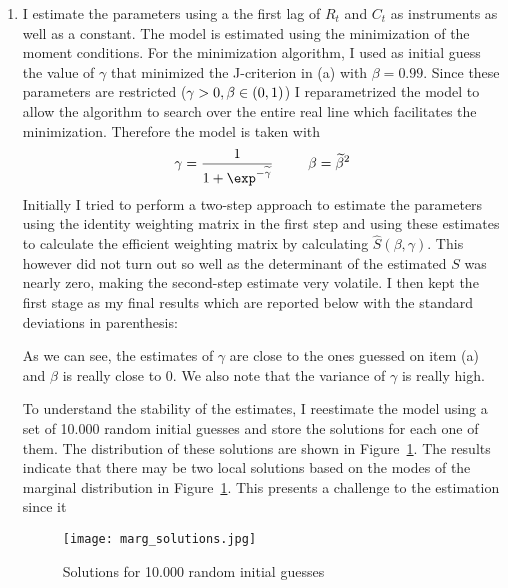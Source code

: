 \begin{solution}
\begin{enumerate}[label = \Alph*)]
    \item I estimate the parameters using a the first lag of \(R_t\) and \(C_t\) as instruments as well as a constant. The model is estimated using the minimization of the moment conditions. For the minimization algorithm, I used as initial guess the value of \(\gamma\) that minimized the J-criterion in (a) with \(\beta = 0.99\). Since these parameters are restricted (\(\gamma > 0, \beta \in \left( 0,1 \right)\)) I reparametrized the model to allow the algorithm to search over the entire real line which facilitates the minimization. Therefore the model is taken with
    \[
        \gamma = \frac{1}{1+\exp^{-\wt\gamma}} \hspace{25pt} \beta = \wt\beta^2
    \]
    Initially I tried to perform a two-step approach to estimate the parameters using the identity weighting matrix in the first step and using these estimates to calculate the efficient weighting matrix by calculating \(\widehat S(\beta,\gamma)\). This however did not turn out so well as the determinant of the estimated \(S\) was nearly zero, making the second-step estimate very volatile. I then kept the first stage as my final results which are reported below with the standard deviations in parenthesis:

    \begin{center}
        
    \end{center}

    As we can see, the estimates of \(\gamma\) are close to the ones guessed on item (a) and \(\beta\) is really close to 0. We also note that the variance of \(\gamma\) is really high.

    To understand the stability of the estimates, I reestimate the model using a set of 10.000 random initial guesses and store the solutions for each one of them. The distribution of these solutions are shown in Figure~\ref{fig:solutions}. The results indicate that there may be two local solutions based on the modes of the marginal distribution in Figure~\ref{fig:solutions}. This presents a challenge to the estimation since it 

    \begin{figure}[H]
        \centering
        \texttt{[image: marg\_solutions.jpg]}
        \caption{Solutions for 10.000 random initial guesses}
        \label{fig:solutions}
    \end{figure}


\end{enumerate}
\end{solution}
